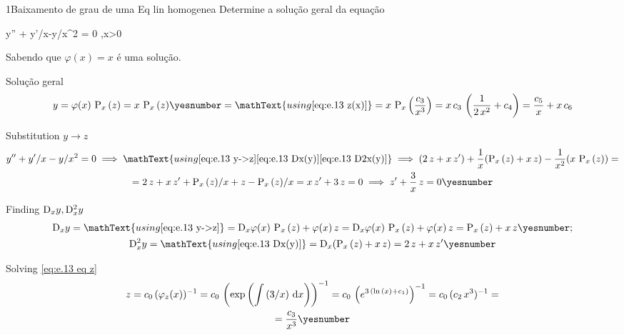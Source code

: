 \documentclass["AM3C-Slides_annotations.tex"]{subfiles}
\begin{document}
\begin{exampleBox}1{Baixamento de grau de uma Eq lin homogenea} %
  Determine a solução geral da equação
  \begin{BM}
    y'' + y'/x-y/x^2 = 0
    ,\quad x>0
  \end{BM}
  Sabendo que \(\varphi(x) = x\) é uma solução.
  
  \answer{}

  Solução geral
  \begin{gather*}
    y
    = \varphi(x)\,\prim_x{(z)}
    = x\,\prim_x{(z)}
    \yesnumber\label{eq:e.13 y->z}
    = \mathText{using \eqref{eq:e.13 z(x)}}
    = x\,\prim_x{\left(
        \frac{c_3}{x^3} 
    \right)}
    = x\,c_3\,\left(\frac{1}{2\,x^2}+c_4\right)
    = \frac{c_5}{x}+x\,c_6
  \end{gather*}

  Substitution \(y \to z\)
  \begin{gather*}
    y'' + y'/x-y/x^2 = 0
    \implies \mathText{using
      \eqref{eq:e.13 y->z}
      \eqref{eq:e.13 Dx(y)}
      \eqref{eq:e.13 D2x(y)}
    }
    \implies
    (
      2\,z + x\,z'
    )
    + \frac{1}{x}(
      \prim_x{(z)} + x\,z
    )
    - \frac{1}{x^2}(
      x\,\prim_x{(z)} 
    )
    = \\
    = 2\,z 
    + x\,z'
    + \prim_x{(z)}/x
    + z
    - \prim_x{(z)}/x
    = x\,z' + 3\,z 
    = 0
    \implies
    z' + \frac{3}{x}\,z = 0
    \yesnumber\label{eq:e.13 eq z}
  \end{gather*}
  
  Finding \(\mdif[1]{x}{y},\mdif[2]{x}{y}\)
  \begin{gather*}
    \mdif{x}{y}
    = \mathText{using \eqref{eq:e.13 y->z}}
    = \mdif{x}{\varphi(x)}
    \,\prim_x{(z)}
    + \varphi(x)\,z
    = \mdif{x}{\varphi(x)}
    \,\prim_x{(z)}
    + \varphi(x)\,z
    = 
    \prim_x{(z)} + x\,z
    \yesnumber\label{eq:e.13 Dx(y)}
    ;\\
    \mdif[2]{x}{y}
    = \mathText{using \eqref{eq:e.13 Dx(y)}}
    = \mdif{x}{(\prim_x{(z)} + x\,z)}
    = 
    2\,z + x\,z'
    \yesnumber\label{eq:e.13 D2x(y)}
  \end{gather*}

  Solving \eqref{eq:e.13 eq z}
  \begin{gather*}
    z
    = c_0\,(\varphi_z(x))^{-1}
    = c_0\,\left(
      \exp{\left(
          \int{(3/x)\,\odif{x}}
      \right)}
    \right)^{-1}
    = c_0\,\left(
      e^{3\,(\ln{(x)}+c_1)}
    \right)^{-1}
    = c_0\,(
      c_2\,x^3
    )^{-1}
    = \\
    = 
    \frac{c_3}{x^3} 
    \yesnumber\label{eq:e.13 z(x)}
  \end{gather*}
\end{exampleBox}
\end{document}
